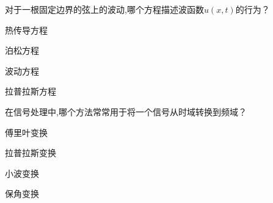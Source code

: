 \documentclass{njustexam}
\begin{document}




\begin{problem}
  对于一根固定边界的弦上的波动,哪个方程描述波函数$u(x, t)$的行为？
  \begin{abcd}
    \item 热传导方程 
    \item 泊松方程
    \item 波动方程
    \item 拉普拉斯方程
    \end{abcd}
\end{problem}

\begin{problem}
  在信号处理中,哪个方法常常用于将一个信号从时域转换到频域？
  \begin{abcd}
    \item 傅里叶变换 
    \item 拉普拉斯变换
    \item 小波变换
    \item 保角变换
  \end{abcd}
\end{problem}



    
    
\end{document}
